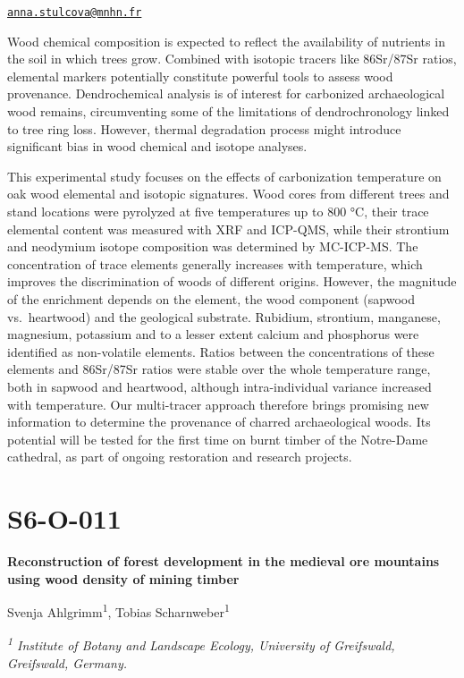 \documentclass[
]{book}
\begin{document}
\href{mailto:anna.stulcova@mnhn.fr}{\nolinkurl{anna.stulcova@mnhn.fr}}

Wood chemical composition is expected to reflect the availability of nutrients in the soil in which trees grow. Combined with isotopic tracers like 86Sr/87Sr ratios, elemental markers potentially constitute powerful tools to assess wood provenance. Dendrochemical analysis is of interest for carbonized archaeological wood remains, circumventing some of the limitations of dendrochronology linked to tree ring loss. However, thermal degradation process might introduce significant bias in wood chemical and isotope analyses.

This experimental study focuses on the effects of carbonization temperature on oak wood elemental and isotopic signatures. Wood cores from different trees and stand locations were pyrolyzed at five temperatures up to 800 °C, their trace elemental content was measured with XRF and ICP-QMS, while their strontium and neodymium isotope composition was determined by MC-ICP-MS. The concentration of trace elements generally increases with temperature, which improves the discrimination of woods of different origins. However, the magnitude of the enrichment depends on the element, the wood component (sapwood vs.~heartwood) and the geological substrate. Rubidium, strontium, manganese, magnesium, potassium and to a lesser extent calcium and phosphorus were identified as non-volatile elements. Ratios between the concentrations of these elements and 86Sr/87Sr ratios were stable over the whole temperature range, both in sapwood and heartwood, although intra-individual variance increased with temperature. Our multi-tracer approach therefore brings promising new information to determine the provenance of charred archaeological woods. Its potential will be tested for the first time on burnt timber of the Notre-Dame cathedral, as part of ongoing restoration and research projects.

\hypertarget{s6-o-011}{%
\section*{S6-O-011}\label{s6-o-011}}

\textbf{Reconstruction of forest development in the medieval ore mountains using wood density of mining timber}

Svenja Ahlgrimm\textsuperscript{1}, Tobias Scharnweber\textsuperscript{1}

\emph{\textsuperscript{1} Institute of Botany and Landscape Ecology, University of Greifswald, Greifswald, Germany.}
\end{document}
